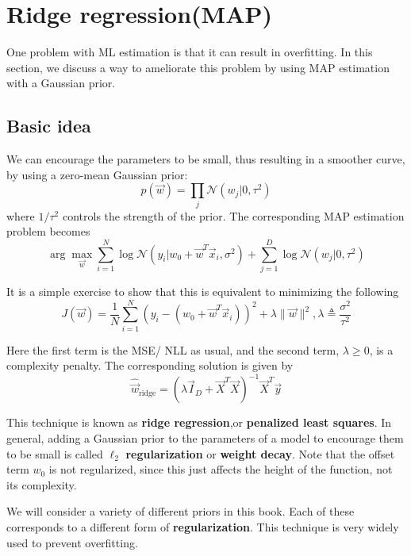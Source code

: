 \section{Ridge regression(MAP)}
One problem with ML estimation is that it can result in overfitting. In this section, we discuss a way to ameliorate this problem by using MAP estimation with a Gaussian prior.


\subsection{Basic idea}
We can encourage the parameters to be small, thus resulting in a smoother curve, by using a zero-mean Gaussian prior:
\begin{equation}
p(\vec{w})=\prod\limits_j \mathcal{N}(w_j|0,\tau^2)
\end{equation}
where $1/\tau^2$ controls the strength of the prior. The corresponding MAP estimation problem becomes
\begin{equation}
\arg\max_{\vec{w}} \sum\limits_{i=1}^N \log{\mathcal{N}(y_i|w_0+\vec{w}^T\vec{x}_i,\sigma^2)}+\sum\limits_{j=1}^D \log{\mathcal{N}(w_j|0,\tau^2)}
\end{equation}

It is a simple exercise to show that this is equivalent to minimizing the following
\begin{equation}\label{eqn:Ridge-regression-J}
J(\vec{w})=\dfrac{1}{N}\sum\limits_{i=1}^N (y_i-(w_0+\vec{w}^T\vec{x}_i))^2+\lambda\lVert\vec{w}\rVert^2 , \lambda \triangleq \dfrac{\sigma^2}{\tau^2}
\end{equation}

Here the first term is the MSE/ NLL as usual, and the second term, $\lambda \geq 0$, is a complexity penalty. The corresponding solution is given by
\begin{equation}\label{eqn:Ridge-regression-solution}
\hat{\vec{w}}_{\mathrm{ridge}}=(\lambda\vec{I}_D+\vec{X}^T\vec{X})^{-1}\vec{X}^T\vec{y}
\end{equation}

This technique is known as \textbf{ridge regression},or \textbf{penalized least squares}. In general, adding a Gaussian prior to the parameters of a model to encourage them to be small is called $\ell_2$ \textbf{regularization} or \textbf{weight decay}. Note that the offset term $w_0$ is not regularized, since this just affects the height of the function, not its complexity.

We will consider a variety of different priors in this book. Each of these corresponds to a different form of \textbf{regularization}. This technique is very widely used to prevent overfitting.


